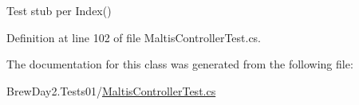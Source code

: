 Test stub per Index()



Definition at line 102 of file Maltis\+Controller\+Test.\+cs.



The documentation for this class was generated from the following file\+:\begin{DoxyCompactItemize}
\item 
Brew\+Day2.\+Tests01/\mbox{\hyperlink{1_2_maltis_controller_test_8cs}{Maltis\+Controller\+Test.\+cs}}\end{DoxyCompactItemize}
